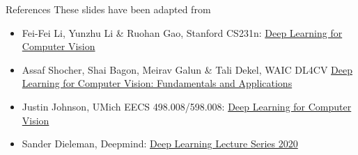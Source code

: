\documentclass[10pt]{beamer}
\theoremstyle{remark}
\theoremstyle{definition}
\begin{document}











\begin{frame}{References}
These slides have been adapted from
\begin{itemize}
    \item Fei-Fei Li, Yunzhu Li \& Ruohan Gao, Stanford CS231n: \href{http://cs231n.stanford.edu/index.html}{Deep Learning for Computer Vision}
    \item Assaf Shocher, Shai Bagon, Meirav Galun \& Tali Dekel, WAIC DL4CV \href{https://dl4cv.github.io/index.html}{Deep Learning for Computer Vision: Fundamentals and Applications}
    \item Justin Johnson, UMich EECS 498.008/598.008: \href{https://web.eecs.umich.edu/~justincj/teaching/eecs498/WI2022/}{Deep Learning for Computer Vision}
    \item Sander Dieleman, Deepmind: \href{https://www.deepmind.com/learning-resources/deep-learning-lecture-series-2020}{Deep Learning Lecture Series 2020}
\end{itemize}

\end{frame}
\end{document}
